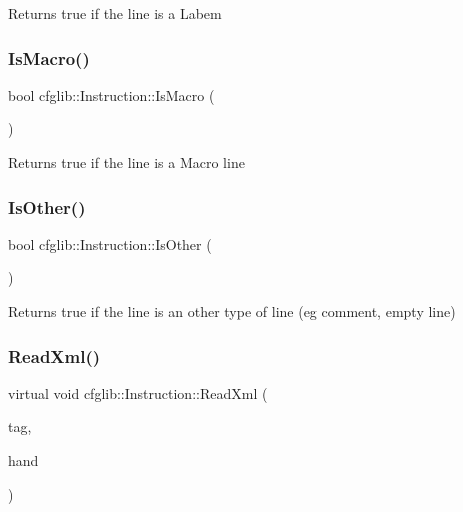 Returns true if the line is a Labem \mbox{\label{classcfglib_1_1Instruction_aa0062264ffcc446ea706e15e3430543d}} 
\subsubsection{\texorpdfstring{Is\+Macro()}{IsMacro()}}
{\footnotesize\ttfamily bool cfglib\+::\+Instruction\+::\+Is\+Macro (\begin{DoxyParamCaption}{ }\end{DoxyParamCaption})\hspace{0.3cm}{\ttfamily [inline]}}

Returns true if the line is a Macro line \mbox{\label{classcfglib_1_1Instruction_aff053b1bab7383efc4f563ad5b6b4c48}} 
\subsubsection{\texorpdfstring{Is\+Other()}{IsOther()}}
{\footnotesize\ttfamily bool cfglib\+::\+Instruction\+::\+Is\+Other (\begin{DoxyParamCaption}{ }\end{DoxyParamCaption})\hspace{0.3cm}{\ttfamily [inline]}}

Returns true if the line is an other type of line (eg comment, empty line) \mbox{\label{classcfglib_1_1Instruction_a993641abc0297a715f66040d6ad7444c}} 
\subsubsection{\texorpdfstring{Read\+Xml()}{ReadXml()}}
{\footnotesize\ttfamily virtual void cfglib\+::\+Instruction\+::\+Read\+Xml (\begin{DoxyParamCaption}\item[{\hyperlink{classXmlTag}{Xml\+Tag} const $\ast$}]{tag,  }\item[{\hyperlink{classcfglib_1_1Handle}{Handle} \&}]{hand }\end{DoxyParamCaption})\hspace{0.3cm}{\ttfamily [virtual]}}

